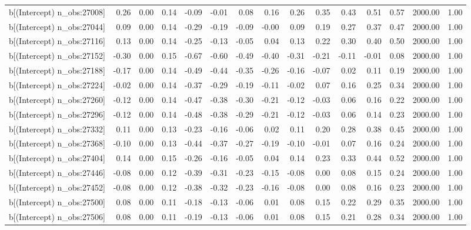 \begin{table}[ht]
\begin{tabular}{rrrrrrrrrrrrrrr}
  b[(Intercept) n\_obs:27008] & 0.26 & 0.00 & 0.14 & -0.09 & -0.01 & 0.08 & 0.16 & 0.26 & 0.35 & 0.43 & 0.51 & 0.57 & 2000.00 & 1.00 \\ 
  b[(Intercept) n\_obs:27044] & 0.09 & 0.00 & 0.14 & -0.29 & -0.19 & -0.09 & -0.00 & 0.09 & 0.19 & 0.27 & 0.37 & 0.47 & 2000.00 & 1.00 \\ 
  b[(Intercept) n\_obs:27116] & 0.13 & 0.00 & 0.14 & -0.25 & -0.13 & -0.05 & 0.04 & 0.13 & 0.22 & 0.30 & 0.40 & 0.50 & 2000.00 & 1.00 \\ 
  b[(Intercept) n\_obs:27152] & -0.30 & 0.00 & 0.15 & -0.67 & -0.60 & -0.49 & -0.40 & -0.31 & -0.21 & -0.11 & -0.01 & 0.08 & 2000.00 & 1.00 \\ 
  b[(Intercept) n\_obs:27188] & -0.17 & 0.00 & 0.14 & -0.49 & -0.44 & -0.35 & -0.26 & -0.16 & -0.07 & 0.02 & 0.11 & 0.19 & 2000.00 & 1.00 \\ 
  b[(Intercept) n\_obs:27224] & -0.02 & 0.00 & 0.14 & -0.37 & -0.29 & -0.19 & -0.11 & -0.02 & 0.07 & 0.16 & 0.25 & 0.34 & 2000.00 & 1.00 \\ 
  b[(Intercept) n\_obs:27260] & -0.12 & 0.00 & 0.14 & -0.47 & -0.38 & -0.30 & -0.21 & -0.12 & -0.03 & 0.06 & 0.16 & 0.22 & 2000.00 & 1.00 \\ 
  b[(Intercept) n\_obs:27296] & -0.12 & 0.00 & 0.14 & -0.48 & -0.38 & -0.29 & -0.21 & -0.12 & -0.03 & 0.06 & 0.14 & 0.23 & 2000.00 & 1.00 \\ 
  b[(Intercept) n\_obs:27332] & 0.11 & 0.00 & 0.13 & -0.23 & -0.16 & -0.06 & 0.02 & 0.11 & 0.20 & 0.28 & 0.38 & 0.45 & 2000.00 & 1.00 \\ 
  b[(Intercept) n\_obs:27368] & -0.10 & 0.00 & 0.13 & -0.44 & -0.37 & -0.27 & -0.19 & -0.10 & -0.01 & 0.07 & 0.16 & 0.24 & 2000.00 & 1.00 \\ 
  b[(Intercept) n\_obs:27404] & 0.14 & 0.00 & 0.15 & -0.26 & -0.16 & -0.05 & 0.04 & 0.14 & 0.23 & 0.33 & 0.44 & 0.52 & 2000.00 & 1.00 \\ 
  b[(Intercept) n\_obs:27446] & -0.08 & 0.00 & 0.12 & -0.39 & -0.31 & -0.23 & -0.15 & -0.08 & 0.00 & 0.08 & 0.15 & 0.24 & 2000.00 & 1.00 \\ 
  b[(Intercept) n\_obs:27452] & -0.08 & 0.00 & 0.12 & -0.38 & -0.32 & -0.23 & -0.16 & -0.08 & 0.00 & 0.08 & 0.16 & 0.23 & 2000.00 & 1.00 \\ 
  b[(Intercept) n\_obs:27500] & 0.08 & 0.00 & 0.11 & -0.18 & -0.13 & -0.06 & 0.01 & 0.08 & 0.15 & 0.22 & 0.29 & 0.35 & 2000.00 & 1.00 \\ 
  b[(Intercept) n\_obs:27506] & 0.08 & 0.00 & 0.11 & -0.19 & -0.13 & -0.06 & 0.01 & 0.08 & 0.15 & 0.21 & 0.28 & 0.34 & 2000.00 & 1.00 \\ 

\end{tabular}
\end{table}
